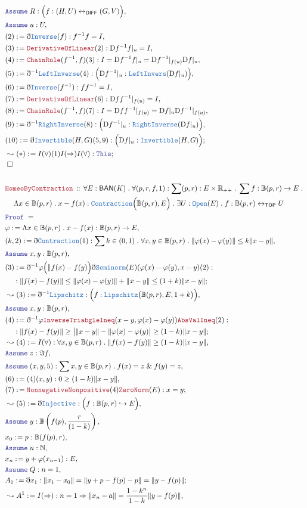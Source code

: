 \documentclass[12pt]{scrartcl}
\newcommand{\TYPE}[1]{\textcolor{NavyBlue}{\mathtt{#1}}}
\newcommand{\LOGIC}[1]{\textcolor{Blue}{\mathtt{#1}}}
\newcommand{\THM}[1]{\textcolor{Maroon}{\mathtt{#1}}}
\renewcommand{\.}{\; . \;}
\newcommand{\de}{: \kern 0.1pc =}
\newcommand{\Theorem}[2]{& \THM{#1} \, :: \, #2 \\ & \Proof = \\ }
\newcommand{\NewLine}{\\ & \kern 1pc}
\newcommand{\Page}[1]{\begin{align*} #1 \end{align*}   }
\newcommand{ \bd }{ \ByDef }
\renewcommand{\And}{\; \& \;}
\newcommand{\Reals}{\mathbb{R} }
\newcommand{\Nat}{\mathbb{N} }
\newcommand{\ToInj}{\hookrightarrow}
\newcommand{\ToBij}{\leftrightarrow}
\newcommand{\Say}[3]{& #1 \de #2 : #3, \\}
\newcommand{\Conclude}[3]{& #1 \de #2 : #3; \\}
\newcommand{\Derive}[3]{& \leadsto #1 \de #2 : #3, \\}
\newcommand{\DeriveConclude}[3]{& \leadsto #1 \de #2 : #3 ; \\}
\newcommand{\A}{\LOGIC{Assume} \;}
\newcommand{\Assume}[2]{& \A #1 : #2, \\}
\newcommand{\QED}{\; \square}
\newcommand{\EndProof}{& \QED \\}
\newcommand{\ByDef}{\eth}
\newcommand{\Proof}{\LOGIC{Proof} \; }
\newcommand{\Ball}{ \mathbb{B} }
\newcommand{\TOP}{\mathsf{TOP}}
\newcommand{\DIFF}{\mathsf{DIFF}}
\newcommand{\BAN}{\mathsf{BAN}} %
\newcommand{\D}{\mathrm{D}}
\begin{document}
\Page{
	\Assume{R}{\Big( f : (H,U) \ToBij_\DIFF (G,V)  \Big) }
	\Assume{u}{U}
	\Say{(2)}{\bd \TYPE{Inverse}(f)}{f^{-1} f  = I}
	\Say{(3)}{ \THM{DerivativeOfLinear}(2)}{\D f^{-1} f |_u = I}
	\Say{(4)}{ \THM{ChainRule}(f^{-1},f)(3)  }{ I = \D f^{-1} f|_u = \D f^{-1} |_{f(u)} \D f |_u  }
	\Say{(5)}{ \bd^{-1} \TYPE{LeftInverse}(4)  }{\Big( \D f^{-1} |_u : \TYPE{LeftInvers}(\D f |_u) \Big)   }
	\Say{(6)}{\bd \TYPE{Inverse}(f^{-1})}{f f^{-1}  = I}
	\Say{(7)}{ \THM{DerivativeOfLinear}(6)}{\D f f^{-1} |_{f(u)} = I}
	\Say{(8)}{ \THM{ChainRule}(f^{-1},f)(7)  }{ I = \D f f^{-1}|_{f(u)} = \D f |_{u} \D f^{-1} |_{f(u)}  }
	\Say{(9)}{ \bd^{-1} \TYPE{RightInverse}(8)  }{\Big( \D f^{-1} |_u : \TYPE{RightInverse}(\D f |_u) \Big)   }
	\Conclude{(10)}{\bd \TYPE{Invertible}(H,G)(5,9)}{\Big( \D f |_u : \TYPE{Invertible}(H,G)  \Big)}
	\DeriveConclude{(*)}{I(\forall)(1)I(\Rightarrow)I(\forall)}{\LOGIC{This}}
	\EndProof
	\\
	\Theorem{HomeoByContraction}{ 
		\forall E : \BAN(K) \.  \forall (p,r,f,1) : \sum (p,r) : E \times \Reals_{++} \. \sum f : \Ball(p,r) \to E \. 
		\NewLine
		\Lambda x \in \Ball(p,r) \. x - f(x) : \TYPE{Contraction}\Big( \Ball(p,r),E \Big)  \.   
		\exists U : \TYPE{Open}(E) \. f : \Ball(p,r) \ToBij_\TOP U 
	}
	\Say{\varphi}{\Lambda x \in \Ball(p,r) \. x - f(x)}{ \Ball(p,r) \to E }
	\Say{(k,2)}{\bd \TYPE{Contraction}(1)}{\sum k \in (0,1) \.  \forall x, y \in \Ball(p,r) \. \| \varphi(x) - \varphi(y) \| \le k\| x - y  \|   }
	\Assume{x,y}{\Ball(p,r)}
	\Conclude{(3)}{ \bd^{-1} \varphi \Big( \| f(x) - f(y) \Big) \bd \TYPE{Seminorm}(E)(\varphi(x) - \varphi(y),x - y)(2)   }
	{
		\NewLine :
		\| f(x) - f(y) \| \le \| \varphi(x) - \varphi(y) \| + \| x - y \| \le (1 + k)\| x - y \| }
	\Derive{(3)}{ \bd^{-1} \TYPE{Lipschitz}   }{ \Big( f : \TYPE{Lipschitz}\big(\Ball(p,r),E,1 + k\big)  \Big) }
	\Assume{x,y}{\Ball(p,r)}
	\Conclude{(4)}{ \bd^{-1} \varphi  \THM{InverseTriabgleIneq}( x - y, \varphi(x) - \varphi(y)  )\THM{AbsValIneq}(2)  }
	{
	 	\NewLine :
		\| f(x) - f(y) \| \ge  \big| \| x - y \| - \| \varphi(x) - \varphi(y) \big| \ge  (1 - k) \| x - y\| 
	}
	\Derive{(4)}{I(\forall)}{ \forall x,y \in  \Ball(p,r)  \. \| f(x) - f(y) \| \ge (1 - k)\| x - y \|}
	\Assume{z}{ \Im f}
	\Assume{(x,y,5)}{\sum x,y \in \Ball(p,r) \. f(x) = z \And f(y) = z}
	\Say{(6)}{(4)(x,y)}{  0 \ge (1 - k)\| x - y \| }
	\Conclude{(7)}{\THM{NonnegativeNonpositive}(4)\THM{ZeroNorm}(E)}{x = y}
	\Derive{(5)}{\bd \TYPE{Injective}}{ \Big( f : \Ball(p,r) \ToInj E  \Big)}
	\Assume{y}{\Ball\left(f(p),\frac{r}{(1 - k)}\right)}
	\Say{x_0}{p}{\Ball(f(p),r)}
	\Assume{n}{\Nat}
	\Say{x_n}{ y + \varphi(x_{n-1})}{E}
	\Assume{Q}{ n = 1}
	\Conclude{A_1}{\bd x_1}{ \| x_1 - x_0 \| = \| y + p - f(p) - p \| = \| y - f(p) \|  }
	\Derive{A^1}{I(\Rightarrow)}{ n = 1 \Rightarrow \| x_n - a\| = \frac{1 - k^n}{1 - k} \| y - f(p) \|   }
}
\end{document}
